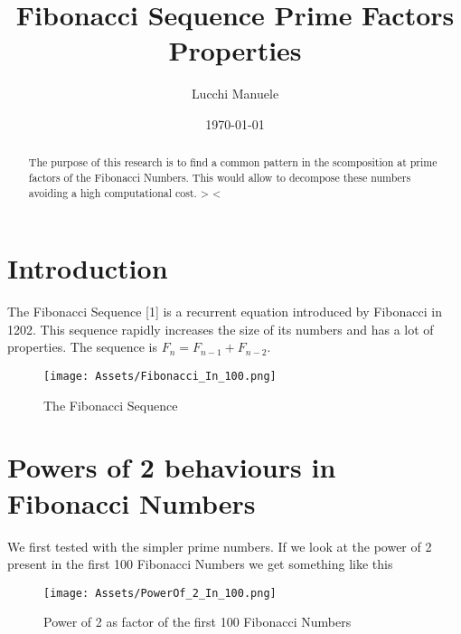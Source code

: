 \documentclass[amsmath,amssymb,aps,pra,reprint,groupedaddress,showpacs]{revtex4-1}
\begin{document}
 

\title{Fibonacci Sequence Prime Factors Properties}
 
\author{Lucchi Manuele}

\date{\today}

\begin{abstract}
The purpose of this research is to find a common pattern in the scomposition at prime factors of the Fibonacci Numbers. 
This would allow to decompose these numbers avoiding a high computational cost. > <
\end{abstract} 
 
\maketitle

\section{Introduction}

The Fibonacci Sequence [1] is a recurrent equation introduced by Fibonacci in 1202. This sequence rapidly increases the size of its numbers and has a lot of properties.
The sequence is $F_n = F_{n-1} + F_{n-2}$. %

\begin{figure}[H]
\centering
\texttt{[image: Assets/Fibonacci\_In\_100.png]}
\caption{The Fibonacci Sequence}
\end{figure} 

\section{Powers of 2 behaviours in Fibonacci Numbers}

We first tested with the simpler prime numbers. If we look at the power of 2 present in the first 100 Fibonacci Numbers we get something like this

\begin{figure}[H]
\centering
\texttt{[image: Assets/PowerOf\_2\_In\_100.png]} %
\caption{Power of 2 as factor of the first 100 Fibonacci Numbers}
\end{figure}
\end{document}
